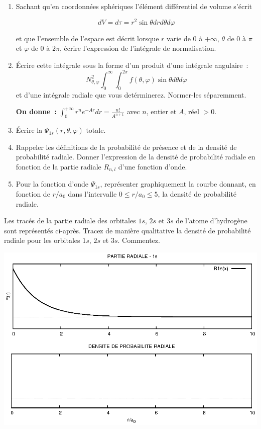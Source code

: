 \begin{enumerate}[\bf 1)]
\item Sachant qu'en coordonn\'ees sph\'eriques l'\'el\'ement diff\'erentiel de volume s'\'ecrit

$$
dV=d\tau=r^2\sin{\theta}dr d\theta d\varphi
$$

et que l'ensemble de l'espace est d\'ecrit lorsque $r$ varie de $0$ \`a $+\infty$, 
$\theta$ de $0$ \`a $\pi$ et $\varphi$ de $0$ \`a $2\pi$, \'ecrire l'expression de l'int\'egrale de 
normalisation.\\

\item \'Ecrire cette int\'egrale sous la forme d'un produit d'une int\'egrale angulaire~:
\[ 
N_{\theta,\varphi}^2 \int_0^\infty \int_0^{2\pi} f(\theta,\varphi) \sin{\theta} d\theta d\varphi
\]
et d'une int\'egrale radiale que vous det\'erminerez. Normer-les s\'eparemment.

\textbf{On donne~:} $\displaystyle \int_0^{+\infty}r^ne^{-Ar}dr=\frac{n!}{A^{n+1}}$ 
avec $n$, entier et $A$, r\'eel $> 0$.

\item \'Ecrire la $\Psi_{1s}(r,\theta,\varphi)$ totale. 

\item Rappeler les d\'efinitions de la probabilit\'e de pr\'esence et de la densit\'e 
de probabilit\'e radiale. Donner l'expression de la densit\'e de probabilit\'e radiale 
en fonction de la partie radiale $R_{n,l}$ d'une fonction d'onde.

\item Pour la fonction d'onde $\Psi_{1s}$, repr\'esenter graphiquement la courbe donnant, 
en fonction de $r/a_0$ dans l'intervalle $0 \leq r/a_0 \leq 5$, la densit\'e de 
probabilit\'e radiale.
\end{enumerate}


Les trac\'es de la partie radiale des orbitales $1s$, $2s$ et $3s$ de l'atome d'hydrog\`ene 
sont repr\'esent\'es ci-apr\`es.
Tracez de mani\`ere qualitative la densit\'e de probabilit\'e radiale pour les orbitales
$1s$, $2s$ et $3s$. Commentez. 

\clearpage
\begin{center}
\includegraphics[angle=90,width=\textwidth]{figure/rad1s.eps}
\end{center}
\clearpage

